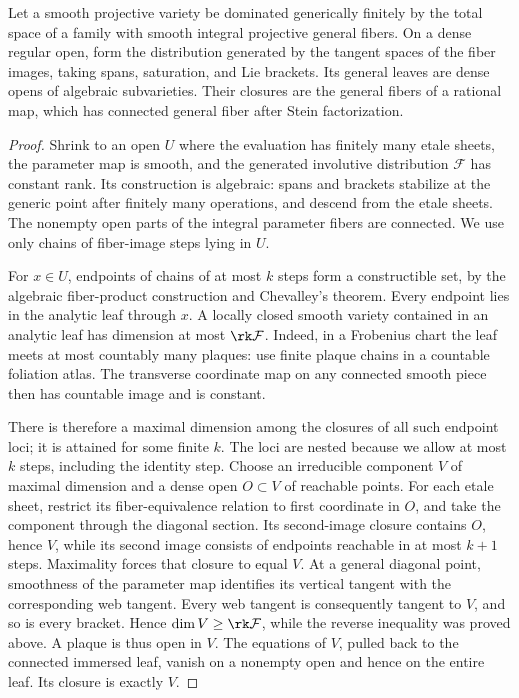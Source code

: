 \begin{lemma}\label{proj:ex:web}
Let a smooth projective variety be dominated generically finitely by
the total space of a family with smooth integral projective general
fibers. On a dense regular open, form the distribution generated by
the tangent spaces of the fiber images, taking spans, saturation,
and Lie brackets. Its general leaves are dense opens of algebraic
subvarieties. Their closures are the general fibers of a rational
map, which has connected general fiber after Stein factorization.
\end{lemma}
\begin{proof}
Shrink to an open \(U\) where the evaluation has finitely many etale
sheets, the parameter map is smooth, and the generated involutive
distribution \(\mathcal F\) has constant rank. Its construction is
algebraic: spans and brackets stabilize at the generic point after
finitely many operations, and descend from the etale sheets. The
nonempty open parts of the integral parameter fibers are connected.
We use only chains of fiber-image steps lying in \(U\).

For \(x\in U\), endpoints of chains of at most \(k\) steps form a
constructible set, by the algebraic fiber-product construction and
Chevalley's theorem. Every endpoint lies in the analytic leaf
through \(x\). A locally closed smooth variety contained in an
analytic leaf has dimension at most \(\rk\mathcal F\). Indeed, in a
Frobenius chart the leaf meets at most countably many plaques: use
finite plaque chains in a countable foliation atlas. The transverse
coordinate map on any connected smooth piece then has countable
image and is constant.

There is therefore a maximal dimension among the closures of all
such endpoint loci; it is attained for some finite \(k\). The loci
are nested because we allow at most \(k\) steps, including the
identity step. Choose an irreducible component \(V\) of maximal
dimension and a dense open \(O\subset V\) of reachable points.
For each etale sheet, restrict its fiber-equivalence relation to
first coordinate in \(O\), and take the component through the
diagonal section. Its second-image closure contains \(O\), hence
\(V\), while its second image consists of endpoints reachable
in at most \(k+1\) steps. Maximality forces that closure to
equal \(V\). At a general
diagonal point, smoothness of the parameter map identifies its
vertical tangent with the corresponding web tangent. Every web
tangent is consequently tangent to \(V\), and so is every bracket. Hence
\(\dim V\geq\rk\mathcal F\), while the reverse inequality was proved
above. A plaque is thus open in \(V\). The equations of \(V\),
pulled back to the connected immersed leaf, vanish on a nonempty
open and hence on the entire leaf. Its closure is exactly \(V\).


\end{proof}
